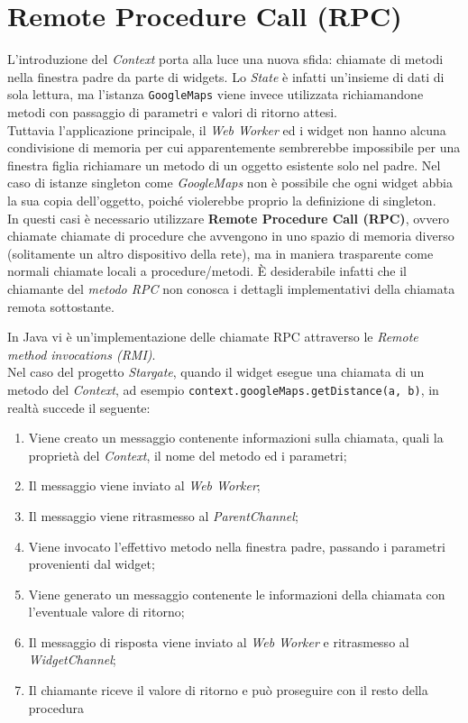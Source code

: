 \section{Remote Procedure Call (RPC)}

L'introduzione del \textit{Context} porta alla luce una nuova sfida: chiamate di metodi nella finestra padre da parte di widgets. Lo \textit{State} è infatti un'insieme di dati di sola lettura, ma l'istanza \texttt{GoogleMaps} viene invece utilizzata richiamandone metodi con passaggio di parametri e valori di ritorno attesi. \\

Tuttavia l'applicazione principale, il \textit{Web Worker} ed i widget non hanno alcuna condivisione di memoria per cui apparentemente sembrerebbe impossibile per una finestra figlia richiamare un metodo di un oggetto esistente solo nel padre. Nel caso di istanze singleton come \textit{GoogleMaps} non è possibile che ogni widget abbia la sua copia dell'oggetto, poiché violerebbe proprio la definizione di singleton. \\

In questi casi è necessario utilizzare \textbf{Remote Procedure Call (RPC)}, ovvero chiamate chiamate di procedure che avvengono in uno spazio di memoria diverso (solitamente un altro dispositivo della rete), ma in maniera trasparente come normali chiamate locali a procedure/metodi. È desiderabile infatti che il chiamante del \textit{metodo RPC} non conosca i dettagli implementativi della chiamata remota sottostante.

In Java vi è un'implementazione delle chiamate RPC attraverso le \textit{Remote method invocations (RMI)}. \\

Nel caso del progetto \textit{Stargate}, quando il widget esegue una chiamata di un metodo del \textit{Context}, ad esempio \texttt{context.googleMaps.getDistance(a, b)}, in realtà succede il seguente:

\begin{enumerate}
  \item Viene creato un messaggio contenente informazioni sulla chiamata, quali la proprietà del \textit{Context}, il nome del metodo ed i parametri;
  \item Il messaggio viene inviato al \textit{Web Worker};
  \item Il messaggio viene ritrasmesso al \textit{ParentChannel};
  \item Viene invocato l'effettivo metodo nella finestra padre, passando i parametri provenienti dal widget;
  \item Viene generato un messaggio contenente le informazioni della chiamata con l'eventuale valore di ritorno;
  \item Il messaggio di risposta viene inviato al \textit{Web Worker} e ritrasmesso al \textit{WidgetChannel};
  \item Il chiamante riceve il valore di ritorno e può proseguire con il resto della procedura
\end{enumerate}

